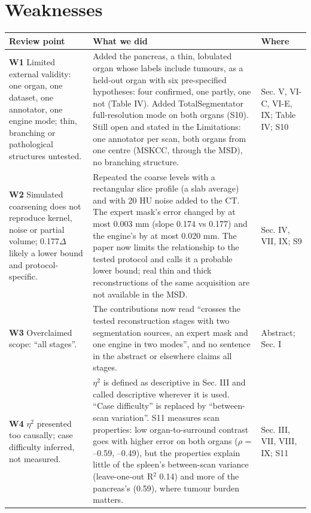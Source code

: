 \documentclass[11pt]{article}
\begin{document}
\section*{Weaknesses}
\begin{longtable}{@{}>{\raggedright\arraybackslash}p{}>{\raggedright\arraybackslash}p{}>{\raggedright\arraybackslash}p{}@{}}
\toprule Review point & What we did & Where \\ \midrule\endhead
\textbf{W1} Limited external validity: one organ, one dataset, one annotator, one engine mode; thin, branching or pathological structures untested. & Added the pancreas, a thin, lobulated organ whose labels include tumours, as a held-out organ with six pre-specified hypotheses: four confirmed, one partly, one not (Table IV). Added TotalSegmentator full-resolution mode on both organs (S10). Still open and stated in the Limitations: one annotator per scan, both organs from one centre (MSKCC, through the MSD), no branching structure. & Sec. V, VI-C, VI-E, IX; Table IV; S10 \\ \midrule
\textbf{W2} Simulated coarsening does not reproduce kernel, noise or partial volume; 0.177$\Delta$ likely a lower bound and protocol-specific. & Repeated the coarse levels with a rectangular slice profile (a slab average) and with 20 HU noise added to the CT. The expert mask's error changed by at most 0.003 mm (slope 0.174 vs 0.177) and the engine's by at most 0.020 mm. The paper now limits the relationship to the tested protocol and calls it a probable lower bound; real thin and thick reconstructions of the same acquisition are not available in the MSD. & Sec. IV, VII, IX; S9 \\ \midrule
\textbf{W3} Overclaimed scope: “all stages”. & The contributions now read “crosses the tested reconstruction stages with two segmentation sources, an expert mask and one engine in two modes”, and no sentence in the abstract or elsewhere claims all stages. & Abstract; Sec. I \\ \midrule
\textbf{W4} $\eta^2$ presented too causally; case difficulty inferred, not measured. & $\eta^2$ is defined as descriptive in Sec. III and called descriptive wherever it is used. “Case difficulty” is replaced by “between-scan variation”. S11 measures scan properties: low organ-to-surround contrast goes with higher error on both organs ($\rho$ = --0.59, --0.49), but the properties explain little of the spleen's between-scan variance (leave-one-out R$^2$ 0.14) and more of the pancreas's (0.59), where tumour burden matters. & Sec. III, VII, VIII, IX; S11 \\ \midrule

\end{longtable}
\end{document}
